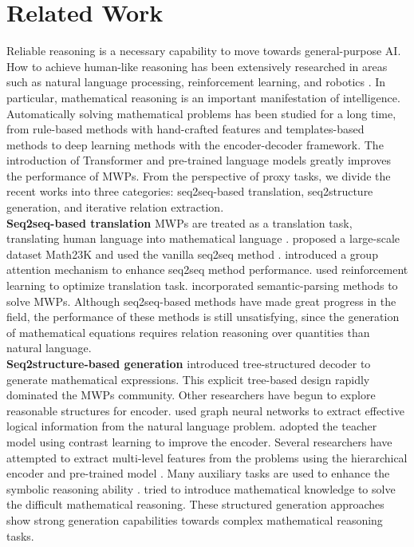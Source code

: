 \documentclass[11pt]{article}
\begin{document}
\section{Related Work}
Reliable reasoning is a necessary capability to move towards general-purpose AI. How to achieve human-like reasoning has been extensively researched in areas such as natural language processing, reinforcement learning, and robotics \citep{ijcai2021p328, Zhang2021LearningTN, ijcai2022p654}. In particular, mathematical reasoning is an important manifestation of intelligence. Automatically solving mathematical problems has been studied for a long time, from rule-based methods \citep{fletcher1985understanding, bakman2007robust,yuhui2010frame} with hand-crafted features and templates-based methods \citep{kushman2014learning, 10.1162/tacl_a_00012} to deep learning methods \citep{wang2017deep, ling-etal-2017-program} with the encoder-decoder framework. The introduction of Transformer \citep{vaswani2017attention} and pre-trained language models \citep{devlin-etal-2019-bert,liu2019roberta} greatly improves the performance of MWPs. From the perspective of proxy tasks, we divide the recent works into three categories: seq2seq-based translation, seq2structure generation, and iterative relation extraction.\\
\indent \textbf{Seq2seq-based translation} MWPs are treated as a translation task, translating human language into mathematical language \citep{ijcai2021-485}. \citet{wang2017deep} proposed a large-scale dataset Math23K and used the vanilla seq2seq method \citep{chiang-chen-2019-semantically}. \citet{li-etal-2019-modeling} introduced a group attention mechanism to enhance seq2seq method performance. \citet{huang-etal-2018-neural} used reinforcement learning to optimize translation task. \citet{huang-etal-2017-learning} incorporated semantic-parsing methods to solve MWPs. Although seq2seq-based methods have made great progress in the field, the performance of these methods is still unsatisfying, since the generation of mathematical equations requires relation reasoning over quantities than natural language.\\
\indent \textbf{Seq2structure-based generation} \citet{liu-etal-2019-tree, xie2019goal} introduced tree-structured decoder to generate mathematical expressions. This explicit tree-based design rapidly dominated the MWPs community. Other researchers have begun to explore reasonable structures for encoder. \citet{li-etal-2020-graph-tree,zhang2020graph,HGEN} used graph neural networks to extract effective logical information from the natural language problem. \citet{ijcai2021-485} adopted the teacher model using contrast learning to improve the encoder. Several researchers have attempted to extract multi-level features from the problems using the hierarchical encoder \citep{lin2021hms} and pre-trained model \citep{yu-etal-2021-improving}. Many auxiliary tasks are used to enhance the symbolic reasoning ability \citep{qin-etal-2021-neural}. \citet{wu2020knowledge,wu-etal-2021-math} tried to introduce mathematical knowledge to solve the difficult mathematical reasoning. These structured generation approaches show strong generation capabilities towards complex mathematical reasoning tasks.\\
\end{document}
